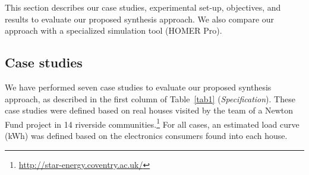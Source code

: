 \documentclass[journal]{IEEEtran}
\begin{document}
This section describes our case studies, experimental set-up,  objectives, and results to evaluate our proposed synthesis approach. We also compare our approach with a specialized simulation tool (HOMER Pro).

\subsection{Case studies} 

We have performed seven case studies to evaluate our proposed synthesis approach, as described in the first column of Table~\ref{tab1} (\textit{Specification}). These case studies were defined based on real houses visited by the team of a Newton Fund project in 14 riverside communities.\footnote{\url{http://star-energy.coventry.ac.uk/}} For all cases, an estimated load curve (kWh) was defined based on the electronics consumers found into each house.
\end{document}
